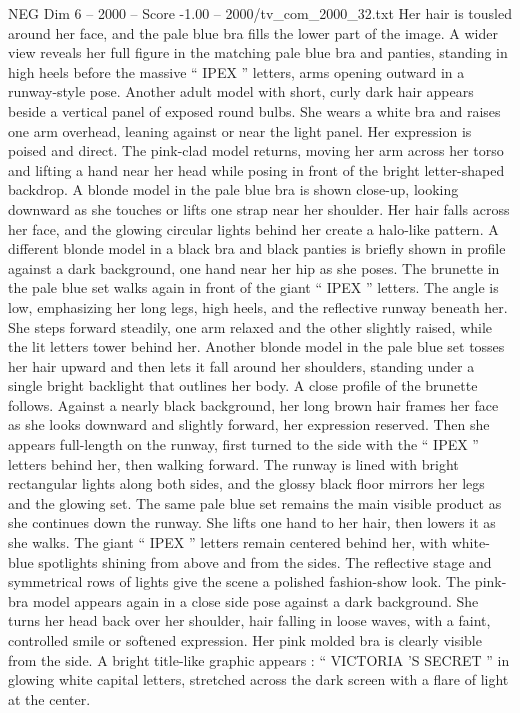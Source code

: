 \begin{textsample}{NEG Dim 6 – 2000 – Score -1.00 – 2000/tv\_com\_2000\_32.txt}
Her hair is tousled around her face, and the pale blue bra fills the lower part of the image.
A wider view reveals her full figure in the matching pale blue bra and panties, standing in high heels before the massive “ IPEX ” letters, arms opening outward in a runway-style pose.
Another adult model with short, curly dark hair appears beside a vertical panel of exposed round bulbs.
She wears a white bra and raises one arm overhead, leaning against or near the light panel.
Her expression is poised and direct.
The pink-clad model returns, moving her arm across her torso and lifting a hand near her head while posing in front of the bright letter-shaped backdrop.
A blonde model in the pale blue bra is shown close-up, looking downward as she touches or lifts one strap near her shoulder.
Her hair falls across her face, and the glowing circular lights behind her create a halo-like pattern.
A different blonde model in a black bra and black panties is briefly shown in profile against a dark background, one hand near her hip as she poses.
The brunette in the pale blue set walks again in front of the giant “ IPEX ” letters.
The angle is low, emphasizing her long legs, high heels, and the reflective runway beneath her.
She steps forward steadily, one arm relaxed and the other slightly raised, while the lit letters tower behind her.
Another blonde model in the pale blue set tosses her hair upward and then lets it fall around her shoulders, standing under a single bright backlight that outlines her body.
A close profile of the brunette follows.
Against a nearly black background, her long brown hair frames her face as she looks downward and slightly forward, her expression reserved.
Then she appears full-length on the runway, first turned to the side with the “ IPEX ” letters behind her, then walking forward.
The runway is lined with bright rectangular lights along both sides, and the glossy black floor mirrors her legs and the glowing set.
The same pale blue set remains the main visible product as she continues down the runway.
She lifts one hand to her hair, then lowers it as she walks.
The giant “ IPEX ” letters remain centered behind her, with white-blue spotlights shining from above and from the sides.
The reflective stage and symmetrical rows of lights give the scene a polished fashion-show look.
The pink-bra model appears again in a close side pose against a dark background.
She turns her head back over her shoulder, hair falling in loose waves, with a faint, controlled smile or softened expression.
Her pink molded bra is clearly visible from the side.
A bright title-like graphic appears : “ VICTORIA ’S SECRET ” in glowing white capital letters, stretched across the dark screen with a flare of light at the center.

\end{textsample}
